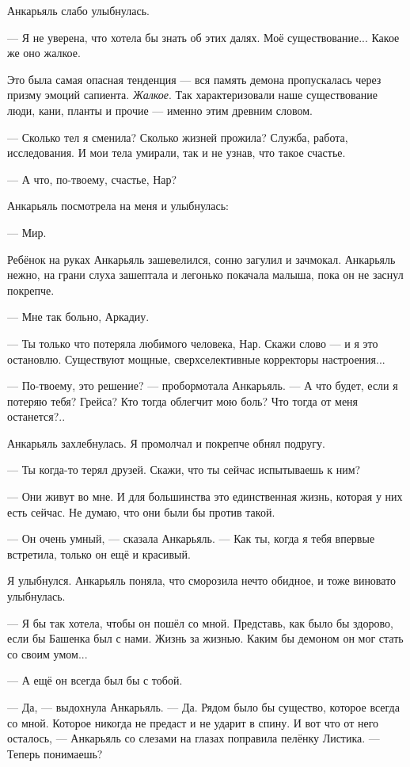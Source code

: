 Анкарьяль слабо улыбнулась.

--- Я не уверена, что хотела бы знать об этих далях.
Моё существование...
Какое же оно жалкое.

Это была самая опасная тенденция --- вся память демона пропускалась через призму эмоций сапиента.
\emph{Жалкое}.
Так характеризовали наше существование люди, кани, планты и прочие --- именно этим древним словом.

--- Сколько тел я сменила?
Сколько жизней прожила?
Служба, работа, исследования.
И мои тела умирали, так и не узнав, что такое счастье.

--- А что, по-твоему, счастье, Нар?

Анкарьяль посмотрела на меня и улыбнулась:

--- Мир.

Ребёнок на руках Анкарьяль зашевелился, сонно загулил и зачмокал.
Анкарьяль нежно, на грани слуха зашептала и легонько покачала малыша, пока он не заснул покрепче.

--- Мне так больно, Аркадиу.

--- Ты только что потеряла любимого человека, Нар.
Скажи слово --- и я это остановлю.
Существуют мощные, сверхселективные корректоры настроения...

--- По-твоему, это решение? --- пробормотала Анкарьяль.
--- А что будет, если я потеряю тебя?
Грейса?
Кто тогда облегчит мою боль?
Что тогда от меня останется?..

Анкарьяль захлебнулась.
Я промолчал и покрепче обнял подругу.

--- Ты когда-то терял друзей.
Скажи, что ты сейчас испытываешь к ним?

--- Они живут во мне.
И для большинства это единственная жизнь, которая у них есть сейчас.
Не думаю, что они были бы против такой.

--- Он очень умный, --- сказала Анкарьяль.
--- Как ты, когда я тебя впервые встретила, только он ещё и красивый.

Я улыбнулся.
Анкарьяль поняла, что сморозила нечто обидное, и тоже виновато улыбнулась.

--- Я бы так хотела, чтобы он пошёл со мной.
Представь, как было бы здорово, если бы Башенка был с нами.
Жизнь за жизнью.
Каким бы демоном он мог стать со своим умом...

--- А ещё он всегда был бы с тобой.

--- Да, --- выдохнула Анкарьяль.
--- Да.
Рядом было бы существо, которое всегда со мной.
Которое никогда не предаст и не ударит в спину.
И вот что от него осталось, --- Анкарьяль со слезами на глазах поправила пелёнку Листика.
--- Теперь понимаешь?


